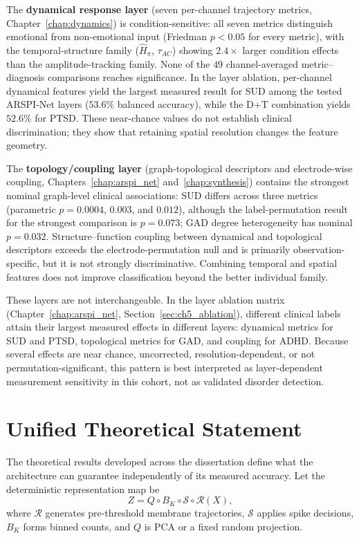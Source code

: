 The \textbf{dynamical response layer} (seven per-channel trajectory metrics, Chapter~\ref{chap:dynamics}) is condition-sensitive: all seven metrics distinguish emotional from non-emotional input (Friedman $p < 0.05$ for every metric), with the temporal-structure family ($\hat{H}_\pi$, $\tau_{AC}$) showing $2.4\times$ larger condition effects than the amplitude-tracking family. None of the $49$ channel-averaged metric--diagnosis comparisons reaches significance. In the layer ablation, per-channel dynamical features yield the largest measured result for SUD among the tested ARSPI-Net layers ($53.6\%$ balanced accuracy), while the D+T combination yields $52.6\%$ for PTSD. These near-chance values do not establish clinical discrimination; they show that retaining spatial resolution changes the feature geometry.

The \textbf{topology/coupling layer} (graph-topological descriptors and electrode-wise coupling, Chapters~\ref{chap:arspi_net} and~\ref{chap:synthesis}) contains the strongest nominal graph-level clinical associations: SUD differs across three metrics (parametric $p = 0.0004$, $0.003$, and $0.012$), although the label-permutation result for the strongest comparison is $p = 0.073$; GAD degree heterogeneity has nominal $p = 0.032$. Structure--function coupling between dynamical and topological descriptors exceeds the electrode-permutation null and is primarily observation-specific, but it is not strongly discriminative. Combining temporal and spatial features does not improve classification beyond the better individual family.

These layers are not interchangeable. In the layer ablation matrix (Chapter~\ref{chap:arspi_net}, Section~\ref{sec:ch5_ablation}), different clinical labels attain their largest measured effects in different layers: dynamical metrics for SUD and PTSD, topological metrics for GAD, and coupling for ADHD. Because several effects are near chance, uncorrected, resolution-dependent, or not permutation-significant, this pattern is best interpreted as layer-dependent measurement sensitivity in this cohort, not as validated disorder detection.


\section{Unified Theoretical Statement}

The theoretical results developed across the dissertation define what the
architecture can guarantee independently of its measured accuracy. Let the
deterministic representation map be
\begin{equation}
Z=Q\circ B_K\circ\mathcal{S}\circ\mathcal{R}(X),
\end{equation}
where $\mathcal{R}$ generates pre-threshold membrane trajectories,
$\mathcal{S}$ applies spike decisions, $B_K$ forms binned counts, and $Q$ is PCA
or a fixed random projection.

